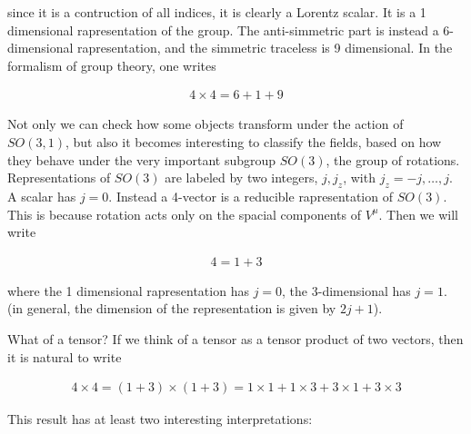 \documentclass{report}
\begin{document}
since it is a contruction of all indices, it is clearly a Lorentz scalar. It is a 1 dimensional rapresentation of the group. The anti-simmetric part is instead a 6-dimensional rapresentation, and the simmetric traceless is 9 dimensional. In the formalism of group theory, one writes 

\begin{align}
    4 \times 4 = 6 + 1 + 9
\end{align}

Not only we can check how some objects transform under the action of \(SO(3, 1)\), but also it becomes interesting to classify the fields, based on how they behave under the very important subgroup \(SO(3)\), the group of rotations. \\

Representations of \(SO(3)\) are labeled by two integers, \(j, j_z\), with \(j_z = -j, \ldots, j\). A scalar has \(j=0\). Instead a 4-vector is a reducible rapresentation of \(SO(3)\). This is because rotation acts only on the spacial components of \(V^\mu\). Then we will write 

\begin{align}
    4 = 1 + 3
\end{align}

where the 1 dimensional rapresentation has \(j=0\), the 3-dimensional has \(j=1\). (in general, the dimension of the representation is given by \(2j+1\)). 

What of a tensor? If we think of a tensor as a tensor product of two vectors, then it is natural to write

\begin{align}
    4 \times 4 = (1 + 3) \times (1+3) = 1 \times 1 + 1 \times 3 + 3 \times 1 + 3 \times 3
\end{align}

This result has at least two interesting interpretations: 
\end{document}
